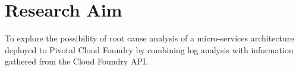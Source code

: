 \chapter{Research Aim}
To explore the possibility of root cause analysis of a micro-services architecture deployed to Pivotal Cloud Foundry by combining log analysis with information gathered from the Cloud Foundry API.